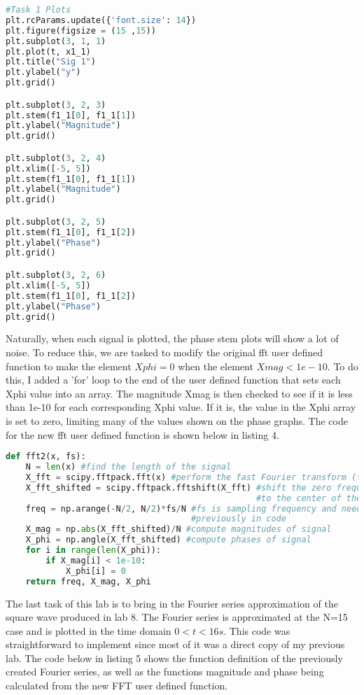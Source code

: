 \documentclass[12pt]{report}
\begin{document}
\begin{lstlisting}[language=Python, caption=Plot code to be referenced for each signal]
#Task 1 Plots
plt.rcParams.update({'font.size': 14})
plt.figure(figsize = (15 ,15))
plt.subplot(3, 1, 1)
plt.plot(t, x1_1)
plt.title("Sig 1")
plt.ylabel("y")
plt.grid()

plt.subplot(3, 2, 3)
plt.stem(f1_1[0], f1_1[1])
plt.ylabel("Magnitude")
plt.grid()

plt.subplot(3, 2, 4)
plt.xlim([-5, 5])
plt.stem(f1_1[0], f1_1[1])
plt.ylabel("Magnitude")
plt.grid()

plt.subplot(3, 2, 5)
plt.stem(f1_1[0], f1_1[2])
plt.ylabel("Phase")
plt.grid()

plt.subplot(3, 2, 6)
plt.xlim([-5, 5])
plt.stem(f1_1[0], f1_1[2])
plt.ylabel("Phase")
plt.grid()
\end{lstlisting}
\hspace{\parindent}Naturally, when each signal is plotted, the phase stem plots will show a lot of noise. To reduce this, we are tasked to modify the original fft user defined function to make the element \(Xphi = 0\) when the element \(Xmag < 1e-10\). To do this, I added a 'for' loop to the end of the user defined function that sets each Xphi value into an array. The magnitude Xmag is then checked to see if it is less than 1e-10 for each corresponding Xphi value. If it is, the value in the Xphi array is set to zero, limiting many of the values shown on the phase graphs. The code for the new fft user defined function is shown below in listing 4. \par
\begin{lstlisting}[language=Python, caption=New FFT user defined function code]
def fft2(x, fs):
    N = len(x) #find the length of the signal
    X_fft = scipy.fftpack.fft(x) #perform the fast Fourier transform (fft)
    X_fft_shifted = scipy.fftpack.fftshift(X_fft) #shift the zero frequency components
                                                  #to the center of the spectrum
    freq = np.arange(-N/2, N/2)*fs/N #fs is sampling frequency and needs to be defined
                                     #previously in code
    X_mag = np.abs(X_fft_shifted)/N #compute magnitudes of signal
    X_phi = np.angle(X_fft_shifted) #compute phases of signal
    for i in range(len(X_phi)):
        if X_mag[i] < 1e-10:
            X_phi[i] = 0
    return freq, X_mag, X_phi
\end{lstlisting}
\hspace{\parindent}The last task of this lab is to bring in the Fourier series approximation of the square wave produced in lab 8. The Fourier series is approximated at the N=15 case and is plotted in the time domain \(0<t<16s\). This code was straightforward to implement since most of it was a direct copy of my previous lab. The code below in listing 5 shows the function definition of the previously created Fourier series, as well as the functions magnitude and phase being calculated from the new FFT user defined function.
\end{document}
